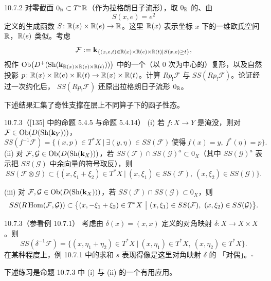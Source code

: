 \begin{wexer}{10.7.2}
  对零截面 $0_{\mathbb{R}}\subset T^*\mathbb{R}$（作为拉格朗日子流形），取 $0_{\mathbb{R}}$ 的、由
  \[
    S(x,e)=e^2
  \]
  定义的生成函数 $S\colon\mathbb{R}(x)\times\mathbb{R}(e)\to\mathbb{R}$。这里 $\mathbb{R}(x)$ 表示坐标 $x$
  下的一维欧氏空间 $\mathbb{R}$，$\mathbb{R}(e)$ 类似。考虑
  \[
    \mathcal F:=\mathbf{k}_{\{(x,e,t)\in\mathbb{R}(x)\times\mathbb{R}(e)\times\mathbb{R}(t)
    \mid S(x,e)\ge t\}},
  \]
  视作 $\operatorname{Ob}\bigl(D^+(\operatorname{Sh}(\mathbf{k}_{\mathbb{R}(x)\times\mathbb{R}(e)\times\mathbb{R}(t)}))
  \bigr)$ 中的一个（以 $0$ 次为中心的）复形，以及自然投影
  $p\colon\mathbb{R}(x)\times\mathbb{R}(e)\times\mathbb{R}(t)\to\mathbb{R}(x)\times\mathbb{R}(t)$。计算
  $Rp_!\mathcal F$ 与 $SS(Rp_!\mathcal F)$。论证经过一次约化后，
  $SS(Rp_!\mathcal F)$ 还原出拉格朗日子流形 $0_{\mathbb{R}}$。
\end{wexer}

下述结果汇集了奇性支撑在层上不同算子下的函子性态。

\begin{wprop}{10.7.3（[135] 中的命题 5.4.5 与命题 5.4.14）}
  (i) 若 $f\colon X\to Y$ 是淹没，则对
  $\mathcal F\in\operatorname{Ob}(D(\operatorname{Sh}(\mathbf{k}_Y)))$，
  \[
    SS(f^{-1}\mathcal F)=\bigl\{(x,p)\in T^*X\ \big|\
    \exists(y,\eta)\in SS(\mathcal F)\ \text{使得}\
    f(x)=y,\ f^*(\eta)=p\bigr\}.
  \]
  (ii) 对 $\mathcal F,\mathcal G\in\operatorname{Ob}(D(\operatorname{Sh}(\mathbf{k}_X)))$，若
  $SS(\mathcal F)\cap SS(\mathcal G)^a\subset0_X$（其中
  $SS(\mathcal G)^a$ 表示把 $SS(\mathcal G)$ 中余向量的符号取反），则
  \[
    SS(\mathcal F\otimes\mathcal G)\subset
    \bigl\{(x,\xi_1+\xi_2)\in T^*X\ \big|\
    (x,\xi_1)\in SS(\mathcal F),\ (x,\xi_2)\in SS(\mathcal G)\bigr\}.
  \]

  (iii) 对 $\mathcal F,\mathcal G\in\operatorname{Ob}(D(\operatorname{Sh}(\mathbf{k}_X)))$，若
  $SS(\mathcal F)\cap SS(\mathcal G)\subset0_X$，则
  \[
    SS(R\operatorname{Hom}(\mathcal F,\mathcal G))\subset
    \bigl\{(x,-\xi_1+\xi_2)\in T^*X\ \big|\
    (x,\xi_1)\in SS(\mathcal F),\ (x,\xi_2)\in SS(\mathcal G)\bigr\}.
  \]
\end{wprop}

\begin{wexam}{10.7.3（参看例 10.7.1）}
  考虑由 $\delta(x)=(x,x)$ 定义的对角映射 $\delta\colon X\to X\times X$。则
  \[
    SS(\delta^{-1}\mathcal F)=\bigl\{(x,\eta_1+\eta_2)\in T^*X\ \big|\
    (x,\eta_1)\in T^*X,\ (x,\eta_2)\in T^*X\bigr\}.
  \]
  在某种程度上，例 10.7.1 中的求和 $s$ 表现得像是这里对角映射 $\delta$ 的
  「对偶」。\hfill$\square$
\end{wexam}

下述练习是命题 10.7.3 中 (i) 与 (ii) 的一个有用应用。

